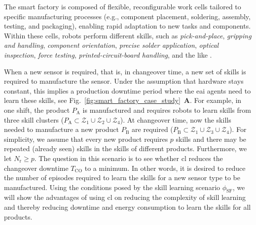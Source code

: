 \documentclass[12pt]{article}
\begin{document}
The smart factory is composed of flexible, reconfigurable work cells tailored to specific manufacturing processes (e.g., component placement, soldering, assembly, testing, and packaging), enabling rapid adaptation to new tasks and components. Within these cells, robots perform different skills, such as \textit{pick-and-place}, \textit{gripping and handling}, \textit{component orientation}, \textit{precise solder application}, \textit{optical inspection}, \textit{force testing}, \textit{printed-circuit-board handling}, and the like \cite{Kirschner2025CategorizingRB}. 

When a new sensor is required, that is, in changeover time, a new set of skills is required to manufacture the sensor. Under the assumption that hardware stays constant, this implies a production downtime period where the \ac{eai} agents need to learn these skills, see Fig.~\ref{fig:smart_factory_case_study}~\textbf{A}. For example, in one shift, the product $ P_\mathrm{A} $ is manufactured and requires robots to learn skills from three skill clusters ($ P_\text{A}\subset\mathcal{Z}_1
\cup\mathcal{Z}_2\cup\mathcal{Z}_4 $). At changeover time, now the skills needed to manufacture a new product $ P_\mathrm{B} $ are required ($P_\text{B}\subset\mathcal{Z}_1\cup\mathcal{Z}_3\cup\mathcal{Z}_4 $). For simplicity, we assume that every new product requires $ p $ skills and there may be repeated (already seen) skills in the skills of different products. Furthermore, we let $ N_\mathrm{r} \geq p $. The question in this scenario is to see whether \ac{cl} reduces the changeover downtime $ T_\mathrm{CO} $ to a minimum. In other words, it is desired to reduce the number of episodes required to learn the skills for a new sensor type to be manufactured. Using the conditions posed by the skill learning scenario $ \phi_\text{SF}$, we will show the advantages of using \ac{cl} on reducing the complexity of skill learning and thereby reducing downtime and energy consumption to learn the skills for all products.
\end{document}
